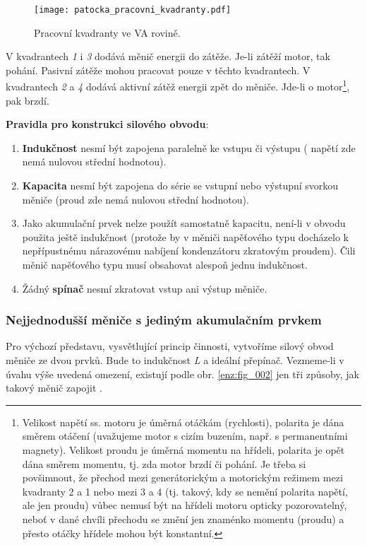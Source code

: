 {      \begin{wrapfigure}[12]{r}{4cm}
        \centering
        \texttt{[image: patocka\_pracovni\_kvadranty.pdf]}
        \caption{Pracovní kvadranty ve VA rovině.}
        \label{enz:fig_006}
      \end{wrapfigure} 
      V kvadrantech \emph{1} i \emph{3} dodává měnič energii do zátěže. Je-li zátěží motor, tak
      pohání. Pasivní zátěže mohou pracovat pouze v těchto kvadrantech. V kvadrantech \emph{2} a
      \emph{4} dodává aktivní zátěž energii zpět do měniče. Jde-li o motor\footnote{Velikost
      napětí ss. motoru je úměrná otáčkám (rychlosti), polarita je dána směrem otáčení
      (uvažujeme motor s cizím buzením, např. s permanentními magnety). Velikost proudu je
      úměrná momentu na hřídeli, polarita je opět dána směrem momentu, tj. zda motor brzdí či
      pohání. Je třeba si povšimnout, že přechod mezi generátorickým a motorickým režimem mezi
      kvadranty 2 a 1 nebo mezi 3 a 4 (tj. takový, kdy se nemění polarita napětí, ale jen
      proudu) vůbec nemusí být na hřídeli motoru opticky pozorovatelný, neboť v dané chvíli
      přechodu se změní jen znaménko momentu (proudu) a přesto otáčky hřídele mohou být
      konstantní.}, pak brzdí.
      
      \textbf{Pravidla pro konstrukci silového obvodu}:
      \begin{enumerate}\addtolength{\itemsep}{-0.5\baselineskip}
        \item \textbf{Indukčnost} nesmí být zapojena paralelně ke vstupu či výstupu ( napětí zde 
              nemá nulovou střední hodnotou).
        \item \textbf{Kapacita} nesmí být zapojena do série se vstupní nebo výstupní svorkou 
              měniče (proud zde nemá nulovou střední hodnotou).
        \item Jako akumulační prvek nelze použít samostatně kapacitu, není-li v obvodu použita
              ještě indukčnost (protože by v měniči napěťového typu docházelo k nepřípustnému
              nárazovému nabíjení kondenzátoru zkratovým proudem). Čili měnič napěťového typu
              musí obsahovat alespoň jednu indukčnost.
        \item Žádný \textbf{spínač} nesmí zkratovat vstup ani výstup měniče.
      \end{enumerate}
      
      \subsubsection{Nejjednodušší měniče s jediným akumulačním 
        prvkem}\label{ENZ:tit_menice_s_1_aku_prvkem} 
        Pro výchozí představu, vysvětlující princip činnosti, vytvoříme silový obvod měniče ze
        dvou prvků. Bude to indukčnost  \emph{L} a ideální přepínač. Vezmeme-li v úvahu výše 
        uvedená omezení, existují podle obr. \ref{enz:fig_002} jen tři způsoby, jak takový měnič 
        zapojit \cite{Patocka}.
      
}
